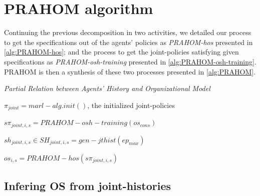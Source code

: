 \documentclass{ecai}
\begin{document}
\section{PRAHOM algorithm}

Continuing the previous decomposition in two activities, we detailed our process to get the specifications out of the agents' policies as \emph{PRAHOM-hos} presented in \autoref{alg:PRAHOM-hos}; and the process to get the joint-policies satisfying given specifications as \emph{PRAHOM-osh-training} presented in \autoref{alg:PRAHOM-osh-training}. PRAHOM is then a synthesis of these two processes presented in \autoref{alg:PRAHOM}.


\begin{algorithm}[hbt!]
    \caption{\emph{Partial Relation between Agents' History and Organizational Model}}\label{alg:PRAHOM}




    $\pi_{joint} = marl-alg.init()$, the initialized joint-policies

    $s\pi_{joint,i,s} = PRAHOM-osh-training(os_{cons})$


    $sh_{joint,i,s} \in SH_{joint,i,s} = gen-jthist(ep_{max})$

    $os_{i,s} = PRAHOM-hos(s\pi_{joint,i,s})$

\end{algorithm}

\subsection{\textbf{Infering OS from joint-histories}}
\end{document}
